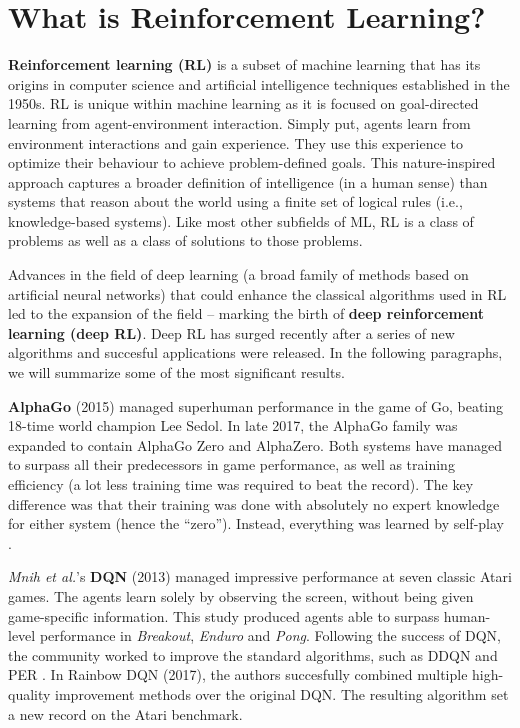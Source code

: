\section{What is Reinforcement Learning?}

\textbf{Reinforcement learning (RL)} is a subset of machine learning that has its origins in computer science and artificial intelligence techniques established in the 1950s.
RL is unique within machine learning as it is focused on goal-directed learning from agent-environment interaction\cite{rlai}.
Simply put, agents learn from environment interactions and gain experience.
They use this experience to optimize their behaviour to achieve problem-defined goals.
This nature-inspired approach captures a broader definition of intelligence (in a human sense) than systems that reason about the world using a finite set of logical rules (i.e., knowledge-based systems).
Like most other subfields of ML, RL is a class of problems as well as a class of solutions to those problems\cite{rlai}.

Advances in the field of deep learning (a broad family of methods based on artificial neural networks\cite{wiki:Deep_learning}) that could enhance the classical algorithms used in RL led to the expansion of the field -- marking the birth of \textbf{deep reinforcement learning (deep RL)}.
Deep RL has surged recently after a series of new algorithms and succesful applications were released. In the following paragraphs, we will summarize some of the most significant results.

\textbf{AlphaGo} (2015)\cite{ago} managed superhuman performance in the game of Go, beating 18-time world champion Lee Sedol.
In late 2017, the AlphaGo family was expanded to contain AlphaGo Zero and AlphaZero\cite{azero}.
Both systems have managed to surpass all their predecessors in game performance, as well as training efficiency \cite{wiki:AlphaGo} (a lot less training time was required to beat the record).
The key difference was that their training was done with absolutely no expert knowledge for either system (hence the ``zero'').
Instead, everything was learned by self-play \cite{azero}.

\textit{Mnih et al.}'s \textbf{DQN}\cite{atari-dqn} (2013) managed impressive performance at seven classic Atari games.
The agents learn solely by observing the screen, without being given game-specific information.
This study produced agents able to surpass human-level performance in \emph{Breakout}, \emph{Enduro} and \emph{Pong}.
Following the success of DQN, the community worked to improve the standard algorithms, such as DDQN \cite{ddqn-paper} and PER \cite{per-paper}.
In Rainbow DQN (2017)\cite{rainbow-dqn}, the authors succesfully combined multiple high-quality improvement methods over the original DQN.
The resulting algorithm set a new record on the Atari benchmark.

